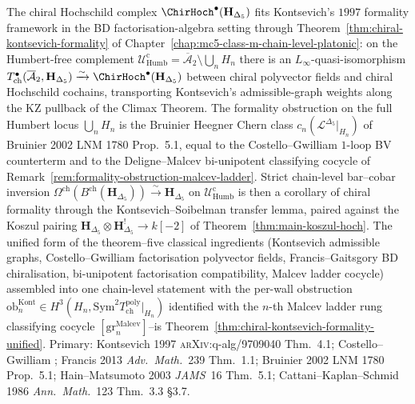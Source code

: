 \begin{remark}
\label{rem:hh-chiral-kontsevich-formality-pointer}
%
The chiral Hochschild complex $\ChirHoch^\bullet(\mathbf H_{\Delta_5})$
fits Kontsevich's $1997$ formality framework in the BD
factorisation-algebra setting through
Theorem~\ref{thm:chiral-kontsevich-formality} of
Chapter~\ref{chap:mc5-class-m-chain-level-platonic}: on the
Humbert-free complement
$\mathcal U_{\mathrm{Humb}}^{\mathrm{c}}=
\overline{\mathcal A}_2\setminus\bigcup_n H_n$ there is an
$L_\infty$-quasi-isomorphism
$T^\bullet_{\mathrm{ch}}(\overline{\mathcal A}_2,\mathbf H_{\Delta_5})
\xrightarrow{\sim}\ChirHoch^\bullet(\mathbf H_{\Delta_5})$
between chiral polyvector fields and chiral Hochschild cochains,
transporting Kontsevich's admissible-graph weights along the KZ
pullback of the Climax Theorem. The formality obstruction on the
full Humbert locus $\bigcup_n H_n$ is the Bruinier Heegner Chern
class $c_n(\mathcal L^{\Delta_5}|_{H_n})$ of Bruinier 2002
\textsc{LNM} 1780 Prop.~5.1, equal to the Costello--Gwilliam
$1$-loop BV counterterm and to the Deligne--Malcev bi-unipotent
classifying cocycle of
Remark~\ref{rem:formality-obstruction-malcev-ladder}. Strict
chain-level bar--cobar inversion
$\Omega^{\mathrm{ch}}(B^{\mathrm{ch}}(\mathbf H_{\Delta_5}))
\xrightarrow{\sim}\mathbf H_{\Delta_5}$ on
$\mathcal U_{\mathrm{Humb}}^{\mathrm{c}}$ is then a corollary of
chiral formality through the Kontsevich--Soibelman transfer lemma,
paired against the Koszul pairing
$\mathbf H_{\Delta_5}\otimes\mathbf H_{\Delta_5}^!\to k[-2]$ of
Theorem~\ref{thm:main-koszul-hoch}. The unified form of the
theorem--five classical ingredients (Kontsevich admissible graphs,
Costello--Gwilliam factorisation polyvector fields, Francis--Gaitsgory
BD chiralisation, bi-unipotent factorisation compatibility,
Malcev ladder cocycle) assembled into one chain-level
statement with the per-wall obstruction
$\mathrm{ob}^{\mathrm{Kont}}_n\in H^3(H_n,\mathrm{Sym}^2
T^{\mathrm{poly}}_{\mathrm{ch}}|_{H_n})$ identified with the $n$-th
Malcev ladder rung classifying cocycle
$[\mathrm{gr}_n^{\mathrm{Malcev}}]$--is
Theorem~\ref{thm:chiral-kontsevich-formality-unified}. Primary:
Kontsevich 1997 \textsc{arXiv}:q-alg/9709040 Thm.~4.1;
Costello--Gwilliam \cite[\S\S 6--8]{CG17}; Francis 2013 \textit{Adv.\
Math.}\ 239 Thm.~1.1; Bruinier 2002 \textsc{LNM} 1780 Prop.~5.1;
Hain--Matsumoto 2003 \textit{JAMS}\ 16 Thm.~5.1; Cattani--Kaplan--Schmid
1986 \textit{Ann.\ Math.}\ 123 Thm.~3.3 \S3.7.
\end{remark}

